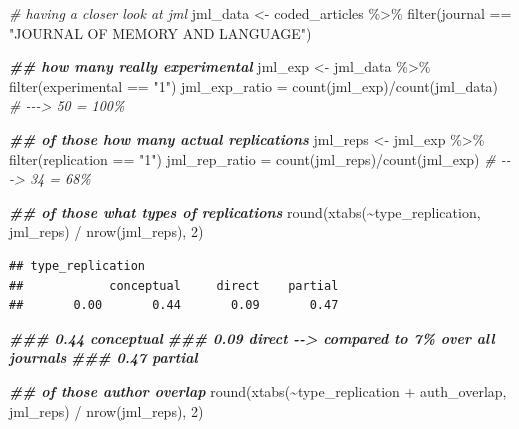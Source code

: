 \documentclass[]{elsarticle} %
\newenvironment{Shaded}{\begin{snugshade}}{\end{snugshade}}
\newcommand{\CommentTok}[1]{\textcolor[rgb]{0.56,0.35,0.01}{\textit{#1}}}
\newcommand{\DecValTok}[1]{\textcolor[rgb]{0.00,0.00,0.81}{#1}}
\newcommand{\DocumentationTok}[1]{\textcolor[rgb]{0.56,0.35,0.01}{\textbf{\textit{#1}}}}
\newcommand{\FunctionTok}[1]{\textcolor[rgb]{0.00,0.00,0.00}{#1}}
\newcommand{\NormalTok}[1]{#1}
\newcommand{\OtherTok}[1]{\textcolor[rgb]{0.56,0.35,0.01}{#1}}
\newcommand{\SpecialCharTok}[1]{\textcolor[rgb]{0.00,0.00,0.00}{#1}}
\newcommand{\StringTok}[1]{\textcolor[rgb]{0.31,0.60,0.02}{#1}}
\begin{document}
\begin{Shaded}
\begin{Highlighting}[]
\CommentTok{\# having a closer look at jml}
\NormalTok{jml\_data }\OtherTok{\textless{}{-}}\NormalTok{ coded\_articles }\SpecialCharTok{\%\textgreater{}\%} 
  \FunctionTok{filter}\NormalTok{(journal }\SpecialCharTok{==} \StringTok{"JOURNAL OF MEMORY AND LANGUAGE"}\NormalTok{)}

\DocumentationTok{\#\# how many really experimental}
\NormalTok{jml\_exp }\OtherTok{\textless{}{-}}\NormalTok{ jml\_data }\SpecialCharTok{\%\textgreater{}\%} 
  \FunctionTok{filter}\NormalTok{(experimental }\SpecialCharTok{==} \StringTok{"1"}\NormalTok{) }
\NormalTok{jml\_exp\_ratio }\OtherTok{=} \FunctionTok{count}\NormalTok{(jml\_exp)}\SpecialCharTok{/}\FunctionTok{count}\NormalTok{(jml\_data) }
\CommentTok{\# {-}{-}{-}\textgreater{} 50 = 100\%}

\DocumentationTok{\#\# of those how many actual replications}
\NormalTok{jml\_reps }\OtherTok{\textless{}{-}}\NormalTok{ jml\_exp }\SpecialCharTok{\%\textgreater{}\%} 
  \FunctionTok{filter}\NormalTok{(replication }\SpecialCharTok{==} \StringTok{"1"}\NormalTok{)}
\NormalTok{jml\_rep\_ratio }\OtherTok{=} \FunctionTok{count}\NormalTok{(jml\_reps)}\SpecialCharTok{/}\FunctionTok{count}\NormalTok{(jml\_exp)}
\CommentTok{\# {-}{-}{-}\textgreater{} 34 = 68\%}

\DocumentationTok{\#\# of those what types of replications}
\FunctionTok{round}\NormalTok{(}\FunctionTok{xtabs}\NormalTok{(}\SpecialCharTok{\textasciitilde{}}\NormalTok{type\_replication, jml\_reps) }\SpecialCharTok{/} \FunctionTok{nrow}\NormalTok{(jml\_reps), }\DecValTok{2}\NormalTok{)}
\end{Highlighting}
\end{Shaded}

\begin{verbatim}
## type_replication
##            conceptual     direct    partial 
##       0.00       0.44       0.09       0.47
\end{verbatim}

\begin{Shaded}
\begin{Highlighting}[]
\DocumentationTok{\#\#\# 0.44 conceptual}
\DocumentationTok{\#\#\# 0.09 direct {-}{-}\textgreater{} compared to 7\% over all journals}
\DocumentationTok{\#\#\# 0.47 partial}

\DocumentationTok{\#\# of those author overlap}
\FunctionTok{round}\NormalTok{(}\FunctionTok{xtabs}\NormalTok{(}\SpecialCharTok{\textasciitilde{}}\NormalTok{type\_replication }\SpecialCharTok{+}\NormalTok{ auth\_overlap, jml\_reps) }\SpecialCharTok{/} \FunctionTok{nrow}\NormalTok{(jml\_reps), }\DecValTok{2}\NormalTok{)}
\end{Highlighting}
\end{Shaded}
\end{document}
